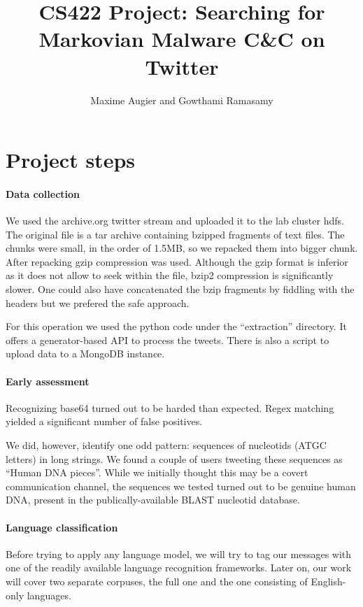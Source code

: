 \documentclass[a4paper,11pt]{article}
\title{CS422 Project: Searching for Markovian Malware C\&C on Twitter}
\author{Maxime Augier and Gowthami Ramasamy}
\begin{document}
\maketitle



\section{Project steps}

\paragraph{Data collection}

We used the archive.org twitter stream and uploaded it to the lab cluster hdfs. The original file is a tar archive containing bzipped fragments of text files. The chunks were small, in the order of 1.5MB, so we repacked them into bigger chunk. After repacking gzip compression was used. Although the gzip format is inferior as it does not allow to seek within the file, bzip2 compression is significantly slower. One could also have concatenated the bzip fragments by fiddling with the headers but we prefered the safe approach.

For this operation we used the python code under the ``extraction'' directory. It offers a generator-based API to process the tweets. There is also a script to upload data to a MongoDB instance.

\paragraph{Early assessment}

Recognizing base64 turned out to be harded than expected. Regex matching yielded a significant number of false positives.

We did, however, identify one odd pattern: sequences of nucleotids (ATGC letters) in long strings. We found a couple of users tweeting these sequences as ``Human DNA pieces''. While we initially thought this may be a covert communication channel, the sequences we tested turned out to be genuine human DNA, present in the publically-available BLAST nucleotid database.

\paragraph{Language classification}

Before trying to apply any language model, we will try to tag our messages with one of the readily available language recognition frameworks. Later on, our work will cover two separate corpuses, the full one and the one consisting of English-only languages.
\end{document}
